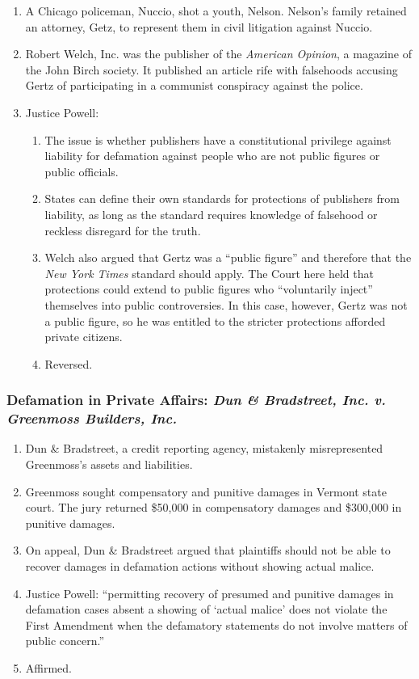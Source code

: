 \begin{enumerate}
    \item A Chicago policeman, Nuccio, shot a youth, Nelson. Nelson's family 
    retained an attorney, Getz, to represent them in civil litigation against 
    Nuccio. 
    \item Robert Welch, Inc. was the publisher of the \emph{American Opinion}, a 
    magazine of the John Birch society. It published an article rife with 
    falsehoods accusing Gertz of participating in a communist conspiracy 
    against the police.
    \item Justice Powell:
    \begin{enumerate}
        \item The issue is whether publishers have a constitutional privilege 
        against liability for defamation against people who are not public 
        figures or public officials.
        \item States can define their own standards for protections of 
        publishers from liability, as long as the standard requires knowledge 
        of falsehood or reckless disregard for the truth.
        \item Welch also argued that Gertz was a ``public figure'' and 
        therefore that the \emph{New York Times} standard should apply. The 
        Court here held that protections could extend to public figures who 
        ``voluntarily inject'' themselves into public controversies. In this 
        case, however, Gertz was not a public figure, so he was entitled to 
        the stricter protections afforded private citizens.
        \item Reversed.
    \end{enumerate}
\end{enumerate}

\subsubsection{Defamation in Private Affairs: \emph{Dun \& Bradstreet, Inc. v. 
Greenmoss Builders, Inc.}}

\begin{enumerate}
    \item Dun \& Bradstreet, a credit reporting agency, mistakenly 
    misrepresented Greenmoss's assets and liabilities.
    \item Greenmoss sought compensatory and punitive damages in Vermont state 
    court. The jury 
    returned \$50,000 in compensatory damages and \$300,000 in punitive 
    damages.
    \item On appeal, Dun \& Bradstreet argued that plaintiffs should not be 
    able to recover damages in defamation actions without showing actual 
    malice.
    \item Justice Powell: ``permitting recovery of presumed and punitive 
    damages in defamation cases absent a showing of `actual malice' does not 
    violate the First Amendment when the defamatory statements do not involve 
    matters of public concern.''
    \item Affirmed.
\end{enumerate}

